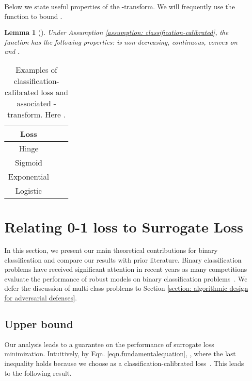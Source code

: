 \documentclass[11pt]{article}
\newtheorem{lemma}[theorem]{Lemma}
\newcommand{\0}{\mathbf{0}}
\newcommand{\1}{\mathbf{1}}
\begin{document}
Below we state useful properties of the -transform. We will frequently use the function  to bound .

\begin{lemma}[\cite{bartlett2006convexity}]
Under Assumption \ref{assumption: classification-calibrated}, the function  has the following properties:  is non-decreasing, continuous, convex on  and . 
\end{lemma}



\begin{table}
\caption{Examples of classification-calibrated loss  and associated -transform. Here .}
\label{table: examples of classification-calibrated loss}
\centering
\begin{tabular}{c|cc}\hline
Loss &  & 
\\
\hline
Hinge &  & \\
Sigmoid &  & \\
Exponential &  & \\
Logistic &  & \\
\hline
\end{tabular}
\end{table}

\section{Relating 0-1 loss to Surrogate Loss}
\vspace{-0.05cm}

In this section, we present our main theoretical
contributions for binary classification and compare our results with  prior literature. Binary classification problems have received significant attention in recent years as many competitions evaluate the performance of robust models on binary classification problems~\cite{brown2018unrestricted}. We defer the discussion of multi-class problems to Section \ref{section: algorithmic design for adversarial defenses}.

\vspace{-0.2cm}
\subsection{Upper bound}
\label{section: upper bound}


Our analysis leads to a guarantee on the performance of surrogate loss minimization. Intuitively, by Eqn. \eqref{eqn.fundamentalequation}, , where the last inequality holds because we choose  as a classification-calibrated loss~\cite{bartlett2006convexity}. This leads to the following result.
\end{document}
